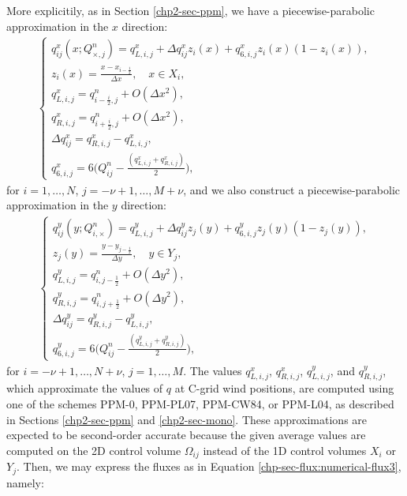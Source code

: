 More explicitily, as in Section \ref{chp2-sec-ppm}, 
we have a piecewise-parabolic approximation in the $x$ direction:
\begin{align}
	\label{chp3-ppmx-eq1}
	\begin{cases}
    q_{ij}^x(x;Q_{\times, j}^n) = q_{L,i,j}^x + \Delta q_{ij}^x z_i(x) + q_{6, i,j}^xz_i(x)(1-z_i(x)), \\
	z_i(x) = \frac{x-x_{i-\frac{1}{2}}}{\Delta x},
	\quad x \in X_i,\\
    q_{L, i,j}^x = q_{i-\frac{i}{2},j}^n+ O(\Delta x^2),\\
    q_{R, i,j}^x = q_{i+\frac{i}{2},j}^n+ O(\Delta x^2),\\
	\Delta q_{ij}^x = q_{R, i,j}^x - q_{L, i,j}^x,\\
	q_{6,i,j}^x = 6\bigg(Q_{ij}^n - \frac{(q_{L,i,j}^x + q_{R,i,j}^x)}{2}\bigg),
	\end{cases}
\end{align}
for $i=1, \ldots, N$, $j=-\nu+1, \ldots, M + \nu$, and we also construct a piecewise-parabolic
approximation in the $y$ direction:
\begin{align}
	\label{chp3-ppmy-eq2}
	\begin{cases}
	q_{ij}^y(y;Q_{i,\times}^n) = q_{L,i,j}^y + \Delta q_{ij}^y z_j(y) + q_{6, i,j}^yz_j(y)(1-z_j(y)),\\ 
	z_j(y) = \frac{y-y_{j-\frac{1}{2}}}{\Delta y},
	\quad y \in Y_j,\\
    q_{L, i,j}^y = q_{i,j-\frac{1}{2}}^n+ O(\Delta y^2),\\
    q_{R, i,j}^y = q_{i,j+\frac{1}{2}}^n+ O(\Delta y^2),\\
	\Delta q_{ij}^y = q_{R, i,j}^y - q_{L, i,j}^y,\\
	q_{6,i,j}^y = 6\bigg(Q_{ij}^n - \frac{(q_{L,i,j}^y + q_{R,i,j}^y)}{2}\bigg),
    \end{cases}
\end{align}
for $i=-\nu+1, \ldots, N + \nu$, $j=1, \ldots, M$.
The values $q_{L,i,j}^x$, $q_{R,i,j}^x$, $q_{L,i,j}^y$, and $q_{R,i,j}^y$,
which approximate the values of $q$ at C-grid wind positions, are computed
using one of the schemes PPM-0, PPM-PL07, PPM-CW84, or PPM-L04, as described
in Sections \ref{chp2-sec-ppm} and \ref{chp2-sec-mono}.
These approximations are expected to be
second-order accurate because the given average values are computed on the
2D control volume $\Omega_{ij}$ instead of the 1D control volumes $X_i$ or $Y_j$.
Then, we may express the fluxes as in Equation \eqref{chp-sec-flux:numerical-flux3}, namely:
